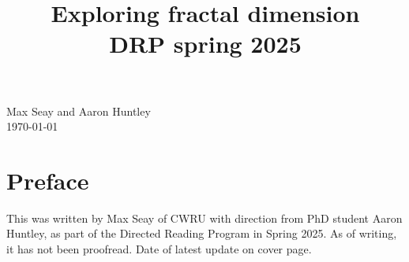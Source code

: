 \documentclass[11pt]{ekblite}
\begin{document}
\title{Exploring fractal dimension\\
DRP spring 2025}
\maketitle
\begin{center}
	Max Seay and Aaron Huntley\\
\today
\end{center}

\tableofcontents

\newpage

\section{Preface}
This was written by Max Seay of CWRU with direction from PhD student Aaron Huntley, as part of the Directed Reading Program in Spring 2025. As of writing, it has not been proofread. Date of latest update on cover page.

\newpage
\end{document}
